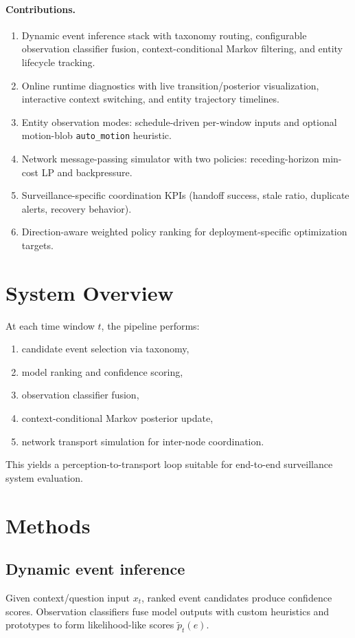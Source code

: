 \documentclass[11pt]{article}
\begin{document}
\paragraph{Contributions.}
\begin{enumerate}[leftmargin=1.5em]
  \item Dynamic event inference stack with taxonomy routing, configurable observation classifier fusion, context-conditional Markov filtering, and entity lifecycle tracking.
  \item Online runtime diagnostics with live transition/posterior visualization, interactive context switching, and entity trajectory timelines.
  \item Entity observation modes: schedule-driven per-window inputs and optional motion-blob \texttt{auto\_motion} heuristic.
  \item Network message-passing simulator with two policies: receding-horizon min-cost LP and backpressure.
  \item Surveillance-specific coordination KPIs (handoff success, stale ratio, duplicate alerts, recovery behavior).
  \item Direction-aware weighted policy ranking for deployment-specific optimization targets.
\end{enumerate}

\section{System Overview}
At each time window $t$, the pipeline performs:
\begin{enumerate}[leftmargin=1.5em]
  \item candidate event selection via taxonomy,
  \item model ranking and confidence scoring,
  \item observation classifier fusion,
  \item context-conditional Markov posterior update,
  \item network transport simulation for inter-node coordination.
\end{enumerate}

This yields a perception-to-transport loop suitable for end-to-end surveillance system evaluation.

\section{Methods}
\subsection{Dynamic event inference}
Given context/question input $x_t$, ranked event candidates produce confidence scores. Observation classifiers fuse model outputs with custom heuristics and prototypes to form likelihood-like scores $\tilde{p}_t(e)$.
\end{document}
